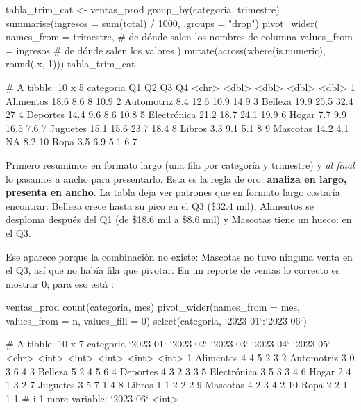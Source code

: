 \begin{rcode}
tabla_trim_cat <- ventas_prod %
  group_by(categoria, trimestre) %
  summarise(ingresos = sum(total) / 1000, .groups = "drop") %
  pivot_wider(
    names_from  = trimestre,    # de dónde salen los nombres de columna
    values_from = ingresos      # de dónde salen los valores
  ) %
  mutate(across(where(is.numeric), ~ round(.x, 1)))
tabla_trim_cat
\end{rcode}
\begin{rsalida}
# A tibble: 10 x 5
   categoria      Q1    Q2    Q3    Q4
   <chr>       <dbl> <dbl> <dbl> <dbl>
 1 Alimentos    18.6   8.6   8    10.9
 2 Automotriz    8.4  12.6  10.9  14.9
 3 Belleza      19.9  25.5  32.4  27  
 4 Deportes     14.4   9.6   8.6  10.8
 5 Electrónica  21.2  18.7  24.1  19.9
 6 Hogar         7.7   9.9  16.5   7.6
 7 Juguetes     15.1  15.6  23.7  18.4
 8 Libros        3.3   9.1   5.1   8  
 9 Mascotas     14.2   4.1  NA     8.2
10 Ropa          3.5   6.9   5.1   6.7
\end{rsalida}

Primero resumimos en formato largo (una fila por categoría y trimestre) y
\emph{al final} lo pasamos a ancho para presentarlo. Esta es la regla de oro:
\textbf{analiza en largo, presenta en ancho}. La tabla deja ver patrones que
en formato largo costaría encontrar: Belleza crece hasta su pico en el Q3
(\$32.4 mil), Alimentos se desploma después del Q1 (de \$18.6 mil a \$8.6
mil) y Mascotas tiene un hueco:  en el Q3.

Ese  aparece porque la combinación no existe: Mascotas no tuvo
ninguna venta en el Q3, así que no había fila que pivotar. En un reporte de ventas lo
correcto es mostrar 0; para eso está :

\begin{rcode}
ventas_prod %
  count(categoria, mes) %
  pivot_wider(names_from = mes, values_from = n,
              values_fill = 0) %
  select(categoria, `2023-01`:`2023-06`)
\end{rcode}
\begin{rsalida}
# A tibble: 10 x 7
   categoria   `2023-01` `2023-02` `2023-03` `2023-04` `2023-05`
   <chr>           <int>     <int>     <int>     <int>     <int>
 1 Alimentos           4         4         5         2         3
 2 Automotriz          3         0         3         6         4
 3 Belleza             5         2         4         5         6
 4 Deportes            4         3         2         3         3
 5 Electrónica         3         5         3         3         4
 6 Hogar               2         4         1         3         2
 7 Juguetes            3         5         7         1         4
 8 Libros              1         1         2         2         2
 9 Mascotas            4         2         3         4         2
10 Ropa                2         2         1         1         1
# i 1 more variable: `2023-06` <int>
\end{rsalida}

